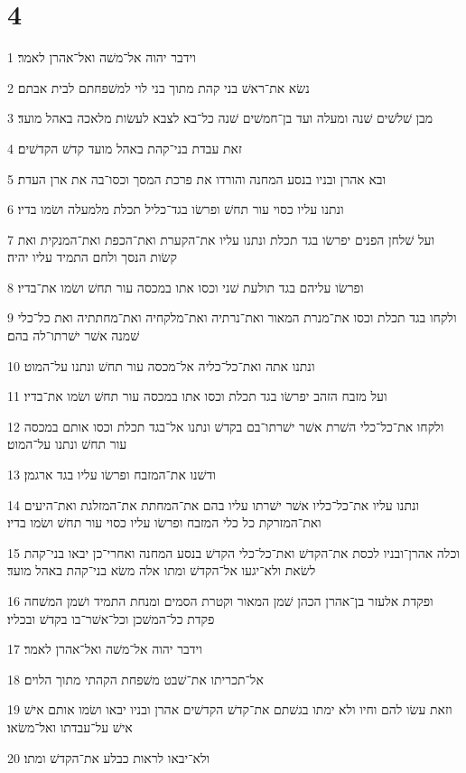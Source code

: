 \chapter{4}

\par 1 וידבר יהוה אל־משׁה ואל־אהרן לאמר׃
\par 2 נשׂא את־ראשׁ בני קהת מתוך בני לוי למשׁפחתם לבית אבתם׃
\par 3 מבן שׁלשׁים שׁנה ומעלה ועד בן־חמשׁים שׁנה כל־בא לצבא לעשׂות מלאכה באהל מועד׃
\par 4 זאת עבדת בני־קהת באהל מועד קדשׁ הקדשׁים׃
\par 5 ובא אהרן ובניו בנסע המחנה והורדו את פרכת המסך וכסו־בה את ארן העדת׃
\par 6 ונתנו עליו כסוי עור תחשׁ ופרשׂו בגד־כליל תכלת מלמעלה ושׂמו בדיו׃
\par 7 ועל שׁלחן הפנים יפרשׂו בגד תכלת ונתנו עליו את־הקערת ואת־הכפת ואת־המנקית ואת קשׂות הנסך ולחם התמיד עליו יהיה׃
\par 8 ופרשׂו עליהם בגד תולעת שׁני וכסו אתו במכסה עור תחשׁ ושׂמו את־בדיו׃
\par 9 ולקחו בגד תכלת וכסו את־מנרת המאור ואת־נרתיה ואת־מלקחיה ואת־מחתתיה ואת כל־כלי שׁמנה אשׁר ישׁרתו־לה בהם׃
\par 10 ונתנו אתה ואת־כל־כליה אל־מכסה עור תחשׁ ונתנו על־המוט׃
\par 11 ועל מזבח הזהב יפרשׂו בגד תכלת וכסו אתו במכסה עור תחשׁ ושׂמו את־בדיו׃
\par 12 ולקחו את־כל־כלי השׁרת אשׁר ישׁרתו־בם בקדשׁ ונתנו אל־בגד תכלת וכסו אותם במכסה עור תחשׁ ונתנו על־המוט׃
\par 13 ודשׁנו את־המזבח ופרשׂו עליו בגד ארגמן׃
\par 14 ונתנו עליו את־כל־כליו אשׁר ישׁרתו עליו בהם את־המחתת את־המזלגת ואת־היעים ואת־המזרקת כל כלי המזבח ופרשׂו עליו כסוי עור תחשׁ ושׂמו בדיו׃
\par 15 וכלה אהרן־ובניו לכסת את־הקדשׁ ואת־כל־כלי הקדשׁ בנסע המחנה ואחרי־כן יבאו בני־קהת לשׂאת ולא־יגעו אל־הקדשׁ ומתו אלה משׂא בני־קהת באהל מועד׃
\par 16 ופקדת אלעזר בן־אהרן הכהן שׁמן המאור וקטרת הסמים ומנחת התמיד ושׁמן המשׁחה פקדת כל־המשׁכן וכל־אשׁר־בו בקדשׁ ובכליו׃
\par 17 וידבר יהוה אל־משׁה ואל־אהרן לאמר׃
\par 18 אל־תכריתו את־שׁבט משׁפחת הקהתי מתוך הלוים׃
\par 19 וזאת עשׂו להם וחיו ולא ימתו בגשׁתם את־קדשׁ הקדשׁים אהרן ובניו יבאו ושׂמו אותם אישׁ אישׁ על־עבדתו ואל־משׂאו׃
\par 20 ולא־יבאו לראות כבלע את־הקדשׁ ומתו׃
